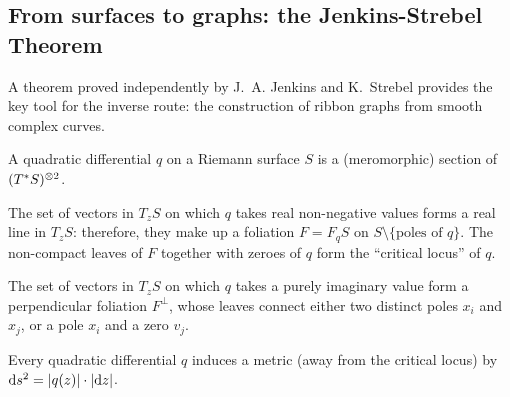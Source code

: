 \subsection{From surfaces to graphs: the Jenkins-Strebel Theorem}
\label{sec:strebel}
A theorem proved independently by J.~A. Jenkins \cite{jenkins;annals}
and K.~Strebel \cite{strebel;quadratic-differentials;1983} provides
the key tool for the inverse route: the construction of ribbon graphs
from smooth complex curves.

\begin{definition}
  A quadratic differential $q$ on a Riemann surface $S$ is a
  (meromorphic) section of $(T^*S)\sp{\otimes 2}$.
\end{definition}
The set of vectors in $T_zS$ on which $q$ takes real non-negative
values forms a real line in $T_zS$: therefore, they make up a
foliation $F = F_qS$ on $S \setminus \{\text{poles of $q$}\}$. The non-compact
leaves of $F$ together with zeroes of $q$ form the ``critical locus''
of $q$.  

The set of vectors in $T_zS$ on which $q$ takes a purely imaginary
value form a perpendicular foliation $F^\perp$, whose leaves connect
either two distinct poles $x_i$ and $x_j$, or a pole $x_i$ and a zero
$v_j$.

Every quadratic differential $q$ induces a metric (away from the
critical locus) by $\mathrm{d} s^2 = \lvert q(z)\rvert \cdot \lvert\mathrm{d} z\rvert$.

